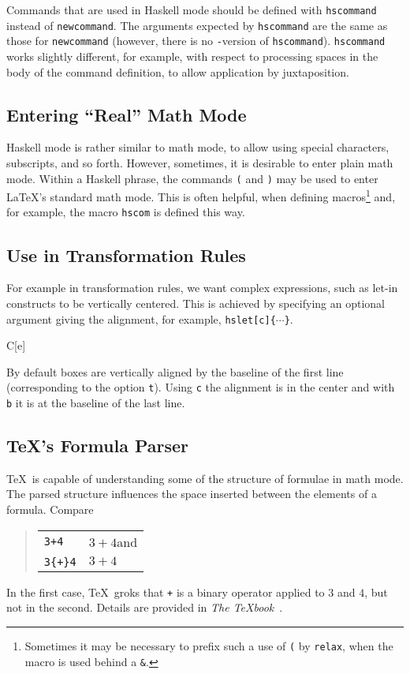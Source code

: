 \documentclass[a4paper]{article}
\newcommand{\cmd}[1]{\texttt{\backslashchar#1}}
\begin{document}
Commands that are used in Haskell mode should be defined with \cmd{hscommand}
instead of \cmd{newcommand}.  The arguments expected by \cmd{hscommand} are
the same as those for \cmd{newcommand} (however, there is no \texttt*-version
of \cmd{hscommand}).  \cmd{hscommand} works slightly different, for example,
with respect to processing spaces in the body of the command definition, to
allow application by juxtaposition.

\subsection{Entering ``Real'' Math Mode}

Haskell mode is rather similar to math mode, to allow using special
characters, subscripts, and so forth.  However, sometimes, it is desirable to
enter plain math mode.  Within a Haskell phrase, the commands \cmd( and \cmd)
may be used to enter \LaTeX's standard math mode.  This is often helpful, when
defining macros\footnote{Sometimes it may be necessary to prefix such a use
  of \cmd( by \cmd{relax}, when the macro is used behind a \texttt{\string&}.}
and, for example, the macro \cmd{hscom} is defined this way.

\subsection{Use in Transformation Rules}

For example in transformation rules, we want complex expressions, such as
let-in constructs to be vertically centered.  This is achieved by specifying
an optional argument giving the alignment, for example,
\cmd{hslet[c]\{$\cdots$\}}. 
%
\begin{haskell}
  \Longrightarrow
  C[e]
\end{haskell}
%
By default boxes are vertically aligned by the baseline of the first line
(corresponding to the option \texttt{t}).  Using \texttt{c} the alignment is
in the center and with \texttt{b} it is at the baseline of the last line.

\subsection{\TeX's Formula Parser}

\TeX\ is capable of understanding some of the structure of formulae in math
mode.  The parsed structure influences the space inserted between the elements 
of a formula.  Compare 
%
\begin{quote}
  \begin{tabular}{l@{~$\Longrightarrow$~}l}
    \texttt{3+4}     & \(3+4\)\quad and\\
    \texttt{3\{+\}4} & \(3{+}4\)
  \end{tabular}
\end{quote}
%
In the first case, \TeX\ groks that \texttt{+} is a binary operator applied to
$3$ and $4$, but not in the second.  Details are provided in \emph{The
  \TeX{}book}~\cite{knuth:tex}.
\end{document}
